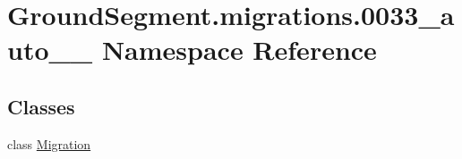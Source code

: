 \hypertarget{namespace_ground_segment_1_1migrations_1_10033__auto__20170130__1316}{}\section{Ground\+Segment.\+migrations.0033\+\_\+auto\+\_\+\_ Namespace Reference}
\label{namespace_ground_segment_1_1migrations_1_10033__auto__20170130__1316}
\subsection*{Classes}
\begin{DoxyCompactItemize}
\item 
class \hyperlink{class_ground_segment_1_1migrations_1_10033__auto__20170130__1316_1_1_migration}{Migration}
\end{DoxyCompactItemize}
